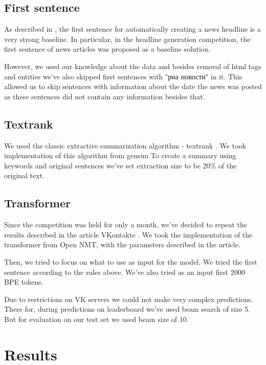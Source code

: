 \documentclass{dialogue}
\begin{document}
\subsection{First sentence}

As described in \cite{Putra2018IncorporatingTS}, the first sentence for automatically creating a news headline is a very strong baseline. In particular, in the headline generation competition, the first sentence of news articles was proposed as a baseline solution.

However, we used our knowledge about the data and besides removal of html tags and entities we've also skipped first sentences with "риа новости" in it. This allowed us to skip sentences with information about the date the news was posted as these sentences did not contain any information besides that.

\subsection{Textrank}

We used the classic extractive summarization algorithm - textrank \cite{DBLP:journals/corr/BarriosLAW16}. We took implementation of this algorithm from gensim \cite{rehurek_lrec} To create a summary using keywords and original sentences we've set extraction size to be 20\% of the original text.

\subsection{Transformer}

Since the competition was held for only a month, we've decided to repeat the results described in the article VKontakte \cite{gavrilov2018self}. We took the implementation of the transformer from Open NMT, with the parameters described in the article.

Then, we tried to focus on what to use as input for the model. We tried the first sentence according to the rules above. We've also tried as an input first 2000 BPE tokens.

Due to restrictions on VK servers we could not make very complex predictions. There for, during predictions on leaderboard we've used beam search of size 5. But for evaluation on our test set we used beam size of 10.

\section{Results}
\end{document}

